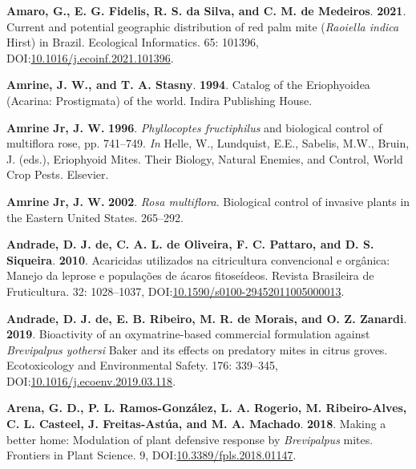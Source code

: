 \documentclass[12pt,final,CPage]{ufthesis}
\newlength{\cslhangindent}
\newenvironment{CSLReferences}[2] %
{%
	\setlength{\parindent}{0pt}
	\ifodd #1 \everypar{\setlength{\hangindent}{\cslhangindent}}\ignorespaces\fi
	\ifnum #2 > 0
	\setlength{\parskip}{#2\baselineskip}
	\fi
}%
{}
\begin{document}
{\begin{CSLReferences}{1}{0}
  \leavevmode{}%
  \textbf{Amaro, G., E. G. Fidelis, R. S. da Silva, and C. M. de Medeiros}. \textbf{2021}. Current and potential geographic distribution of red palm mite ({\emph{Raoiella indica}} {Hirst}) in {Brazil}. Ecological Informatics. 65: 101396, DOI:\href{https://doi.org/10.1016/j.ecoinf.2021.101396}{10.1016/j.ecoinf.2021.101396}.

  \leavevmode{}%
  \textbf{Amrine, J. W., and T. A. Stasny}. \textbf{1994}. Catalog of the {Eriophyoidea} ({Acarina}: {Prostigmata}) of the world. Indira Publishing House.

  \leavevmode{}%
  \textbf{Amrine Jr, J. W.} \textbf{1996}. {\emph{Phyllocoptes fructiphilus}} and biological control of multiflora rose, pp. 741--749. \emph{In} Helle, W., Lundquist, E.E., Sabelis, M.W., Bruin, J. (eds.), Eriophyoid Mites. Their Biology, Natural Enemies, and Control, World Crop Pests. Elsevier.

  \leavevmode{}%
  \textbf{Amrine Jr, J. W.} \textbf{2002}. {\emph{Rosa multiflora}}. Biological control of invasive plants in the Eastern {United States}. 265--292.

  \leavevmode{}%
  \textbf{Andrade, D. J. de, C. A. L. de Oliveira, F. C. Pattaro, and D. S. Siqueira}. \textbf{2010}. Acaricidas utilizados na citricultura convencional e org{â}nica: Manejo da leprose e popula{ç}{õ}es de {á}caros fitose{í}deos. Revista Brasileira de Fruticultura. 32: 1028--1037, DOI:\href{https://doi.org/10.1590/s0100-29452011005000013}{10.1590/s0100-29452011005000013}.

  \leavevmode{}%
  \textbf{Andrade, D. J. de, E. B. Ribeiro, M. R. de Morais, and O. Z. Zanardi}. \textbf{2019}. Bioactivity of an oxymatrine-based commercial formulation against {\emph{Brevipalpus yothersi}} {Baker} and its effects on predatory mites in citrus groves. Ecotoxicology and Environmental Safety. 176: 339--345, DOI:\href{https://doi.org/10.1016/j.ecoenv.2019.03.118}{10.1016/j.ecoenv.2019.03.118}.

  \leavevmode{}%
  \textbf{Arena, G. D., P. L. Ramos-González, L. A. Rogerio, M. Ribeiro-Alves, C. L. Casteel, J. Freitas-Astúa, and M. A. Machado}. \textbf{2018}. Making a better home: Modulation of plant defensive response by {\emph{Brevipalpus}} mites. Frontiers in Plant Science. 9, DOI:\href{https://doi.org/10.3389/fpls.2018.01147}{10.3389/fpls.2018.01147}.


\end{CSLReferences}}
\end{document}
